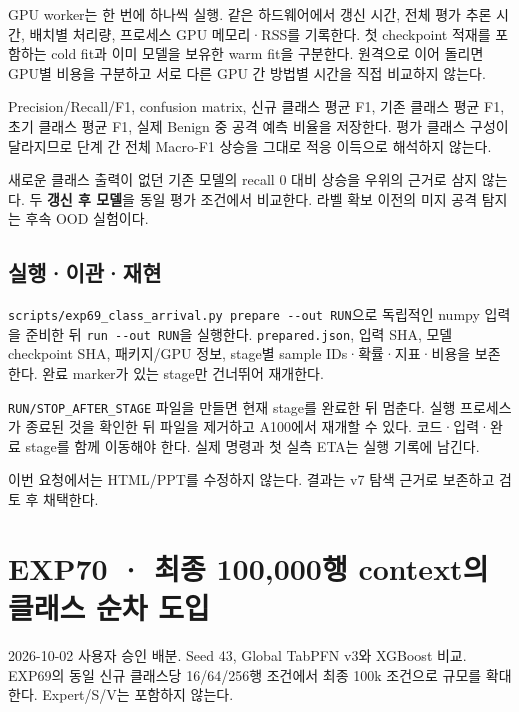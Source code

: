 \par\noindent \textbullet\enspace GPU worker는 한 번에 하나씩 실행. 같은 하드웨어에서 갱신 시간, 전체 평가 추론 시간, 배치별 처리량, 프로세스 GPU 메모리·RSS를 기록한다. 첫 checkpoint 적재를 포함하는 cold fit과 이미 모델을 보유한 warm fit을 구분한다. 원격으로 이어 돌리면 GPU별 비용을 구분하고 서로 다른 GPU 간 방법별 시간을 직접 비교하지 않는다.


\par\noindent \textbullet\enspace Precision/\allowbreak{}Recall/\allowbreak{}F1, confusion matrix, 신규 클래스 평균 F1, 기존 클래스 평균 F1, 초기 클래스 평균 F1, 실제 Benign 중 공격 예측 비율을 저장한다. 평가 클래스 구성이 달라지므로 단계 간 전체 Macro-F1 상승을 그대로 적응 이득으로 해석하지 않는다.


\par\noindent \textbullet\enspace 새로운 클래스 출력이 없던 기존 모델의 recall 0 대비 상승을 우위의 근거로 삼지 않는다. 두 \textbf{갱신 후 모델}을 동일 평가 조건에서 비교한다. 라벨 확보 이전의 미지 공격 탐지는 후속 OOD 실험이다.


\subsection{실행·이관·재현}
\texttt{scripts/\allowbreak{}\allowbreak{}exp69\_\allowbreak{}\allowbreak{}cl\allowbreak{}ass\_\allowbreak{}\allowbreak{}arri\allowbreak{}val.\allowbreak{}py p\allowbreak{}repare -\allowbreak{}-\allowbreak{}out RUN\allowbreak{}}으로 독립적인 numpy 입력을 준비한 뒤 \texttt{run -\allowbreak{}-\allowbreak{}ou\allowbreak{}t RUN}을 실행한다. \texttt{prepared\allowbreak{}.\allowbreak{}json}, 입력 SHA, 모델 checkpoint SHA, 패키지/\allowbreak{}GPU 정보, stage별 sample IDs·확률·지표·비용을 보존한다. 완료 marker가 있는 stage만 건너뛰어 재개한다.

\texttt{RUN/\allowbreak{}\allowbreak{}STOP\allowbreak{}\_\allowbreak{}\allowbreak{}AFTER\_\allowbreak{}\allowbreak{}S\allowbreak{}TAGE} 파일을 만들면 현재 stage를 완료한 뒤 멈춘다. 실행 프로세스가 종료된 것을 확인한 뒤 파일을 제거하고 A100에서 재개할 수 있다. 코드·입력·완료 stage를 함께 이동해야 한다. 실제 명령과 첫 실측 ETA는 실행 기록에 남긴다.

이번 요청에서는 HTML/\allowbreak{}PPT를 수정하지 않는다. 결과는 v7 탐색 근거로 보존하고 검토 후 채택한다.



\section{EXP70 · 최종 100,000행 context의 클래스 순차 도입}
2026-10-02 사용자 승인 배분. Seed 43, Global TabPFN v3와 XGBoost 비교. EXP69의 동일 신규 클래스당 16/\allowbreak{}64/\allowbreak{}256행 조건에서 최종 100k 조건으로 규모를 확대한다. Expert/\allowbreak{}S/\allowbreak{}V는 포함하지 않는다.

